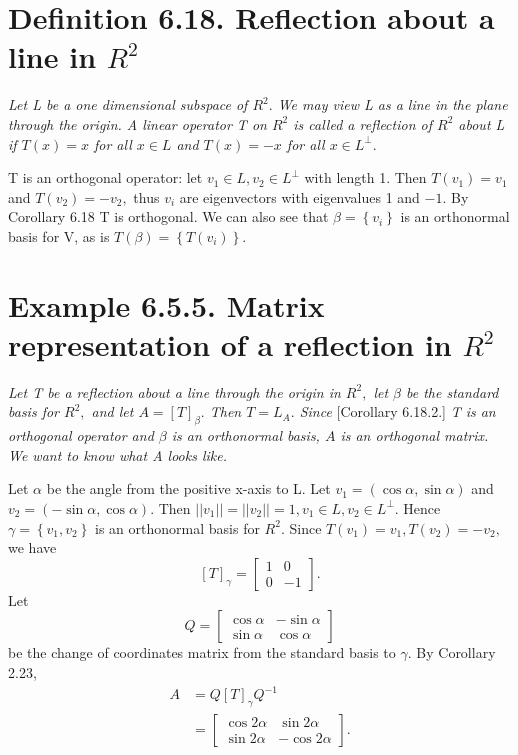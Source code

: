 \documentclass[12pt,english]{article}
\begin{document}
\section{Definition 6.18. Reflection about a line in $R^{2}$}

\emph{Let L be a one dimensional subspace of $R^{2}.$ We may view
L as a line in the plane through the origin. A linear operator T on
$R^{2}$ is called a reflection of $R^{2}$ about L if $T(x)=x$ for
all $x\in L$ and $T(x)=-x$ for all $x\in L^{\perp}.$ }

T is an orthogonal operator: let $v_{1}\in L,v_{2}\in L^{\perp}$
with length 1. Then $T(v_{1})=v_{1}$ and $T(v_{2})=-v_{2},$ thus
$v_{i}$ are eigenvectors with eigenvalues 1 and $-1.$ By Corollary
6.18 T is orthogonal. We can also see that $\beta=\left\{ v_{i}\right\} $
is an orthonormal basis for V, as is $T(\beta)=\left\{ T(v_{i})\right\} .$

\section{Example 6.5.5. Matrix representation of a reflection in $R^{2}$ }

\emph{Let T be a reflection about a line through the origin in $R^{2},$
let $\beta$ be the standard basis for $R^{2},$ and let $A=\left[T\right]_{\beta}.$
Then $T=L_{A}.$ Since }{[}Corollary 6.18.2.{]}\emph{ T is an orthogonal
operator and $\beta$ is an orthonormal basis, $A$ is an orthogonal
matrix. We want to know what A looks like.}

Let $\alpha$ be the angle from the positive x-axis to L. Let $v_{1}=\left(\cos\alpha,\sin\alpha\right)$
and $v_{2}=\left(-\sin\alpha,\cos\alpha\right).$ Then $\left|\left|v_{1}\right|\right|=\left|\left|v_{2}\right|\right|=1,v_{1}\in L,v_{2}\in L^{\perp}.$
Hence $\gamma=\left\{ v_{1},v_{2}\right\} $ is an orthonormal basis
for $R^{2}.$ Since $T(v_{1})=v_{1},T(v_{2})=-v_{2},$ we have
\[
\left[T\right]_{\gamma}=\begin{bmatrix}1 & 0\\
0 & -1
\end{bmatrix}.
\]
Let
\[
Q=\begin{bmatrix}\cos\alpha & -\sin\alpha\\
\sin\alpha & \cos\alpha
\end{bmatrix}
\]
be the change of coordinates matrix from the standard basis to $\gamma.$
By Corollary 2.23,
\[
\begin{aligned}A & =Q\left[T\right]_{\gamma}Q^{-1}\\
 & =\begin{bmatrix}\cos2\alpha & \sin2\alpha\\
\sin2\alpha & -\cos2\alpha
\end{bmatrix}.
\end{aligned}
\]
\end{document}
